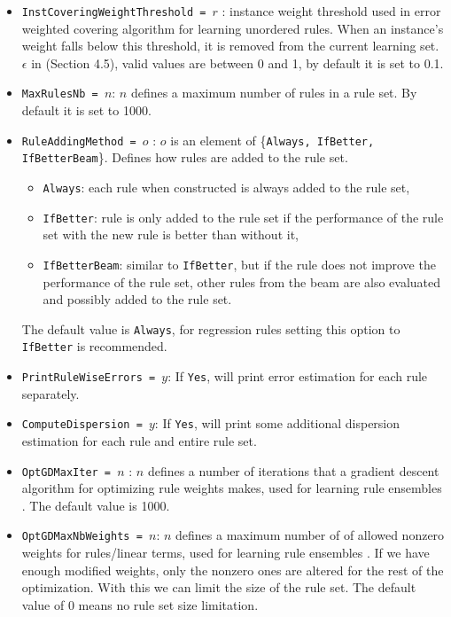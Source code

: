 \begin{itemize}
	\item \texttt{InstCoveringWeightThreshold = $r$} : instance weight threshold used in error weighted covering algorithm for learning unordered rules. When an instance's weight falls below this threshold, it is removed from the current learning set.  $\epsilon$ in \cite{Zenko07} (Section 4.5), valid values are between 0 and 1, by default it is set to 0.1.
	\item \texttt{MaxRulesNb = $n$}: $n$ defines a maximum number of rules in a rule set. By default it is set to 1000.
	\item \texttt{RuleAddingMethod = $o$} : $o$ is an element of \{\texttt{Always, IfBetter, IfBetterBeam}\}. Defines how rules are added to the rule set.
	\begin{itemize}
		\item \texttt{Always}: each rule when constructed is always added to the rule set,
		\item \texttt{IfBetter}: rule is only added to the rule set if the performance of the rule set with the new rule is better than without it,
		\item \texttt{IfBetterBeam}: similar to \texttt{IfBetter}, but if the rule does not improve the performance of the rule set, other rules from the beam are also evaluated and possibly added to the rule set.
	\end{itemize}
	The default value is \texttt{Always}, for regression rules setting this option to \texttt{IfBetter} is recommended.
	\item \texttt{PrintRuleWiseErrors = $y$}: If \texttt{Yes},  \clus{} will print error estimation for each rule separately.
	\item {\tt ComputeDispersion = $y$}: If \texttt{Yes},  \clus{} will print some additional dispersion estimation for each rule and entire rule set.
	\item \texttt{OptGDMaxIter = $n$} : $n$ defines a number of iterations that a gradient descent algorithm for
	optimizing rule weights makes, used for learning rule ensembles \cite{Aho2009}. The default value is 1000.
	\item \texttt{OptGDMaxNbWeights = $n$}: $n$ defines a maximum number of of allowed nonzero weights for
	rules/linear terms, used for learning rule ensembles \cite{Aho2009}. If we have enough modified weights, only the nonzero ones are altered for the rest of the optimization. With this we can limit the size of the rule set. The default value of 0 means no rule set size limitation.

\end{itemize}
